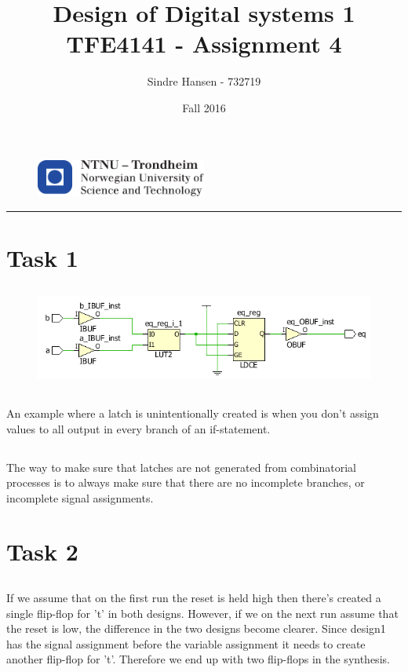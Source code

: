 \documentclass{article}
\title{Design of Digital systems 1 TFE4141 - Assignment 4}
\author{Sindre Hansen - 732719}
\date{Fall 2016}
\begin{document}
\begin{figure}
  \centering
  \includegraphics[width=0.5\textwidth]{images/logontnu_eng}
\end{figure}
\maketitle
\rule{\linewidth}{0.5mm}

\section{Task 1}
\subsection{}
\begin{figure}[hbp]
  \centering
  \includegraphics[width=\textwidth]{images/task1-1}
\end{figure}

\subsection{}
An example where a latch is unintentionally created is when you don't
assign values to all output in every branch of an if-statement.

\subsection{}
The way to make sure that latches are not generated from combinatorial
processes is to always make sure that there are no incomplete
branches, or incomplete signal assignments.

\section{Task 2}
\subsection{}
If we assume that on the first run the reset is held high then there's
created a single flip-flop for 't' in both designs. However, if we on
the next run assume that the reset is low, the difference in the two
designs become clearer. Since design1 has the signal assignment before
the variable assignment it needs to create another flip-flop for
't'. Therefore we end up with two flip-flops in the synthesis.
\end{document}
